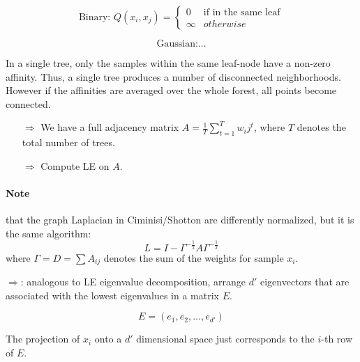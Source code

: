 \[\text{Binary: } Q(x_i, x_j) = \begin{cases} 0 & \text{if in the same leaf} \\ \infty & otherwise \end{cases}\]

\[\text{Gaussian:} ...\]

In a single tree, only the samples within the same leaf-node have a non-zero affinity. Thus, a single tree produces a number of disconnected neighborhoods.
However if the affinities are averaged over the whole forest, all points become connected.

\begin{itemize}
  \item[\(\Rightarrow\)] We have a full adjacency matrix \(A = \frac{1}{T} \sum_{t=1}^T w_ij^t\), where \(T\) denotes the total number of trees.
  \item[\(\Rightarrow\)] Compute LE on \(A\).
\end{itemize}


\paragraph{Note} that the graph Laplacian in Ciminisi/Shotton  are differently normalized, but it is the same algorithm:
\[L = I - \Gamma^{-\frac{1}{2}} A \Gamma^{-\frac{1}{2}}\]
where \(\Gamma = D = \sum A_{ij}\) denotes the sum of the weights for sample \(x_i\).

\bigbreak
\(\Rightarrow\): analogous to LE eigenvalue decomposition, arrange \(d'\) eigenvectors that are associated with the lowest eigenvalues in a matrix $E$.

\[E = (e_1, e_2, \dots, e_{d'})\]

The projection of \(x_i\) onto a \(d'\) dimensional space just corresponds to the \(i\)-th row of \(E\).
